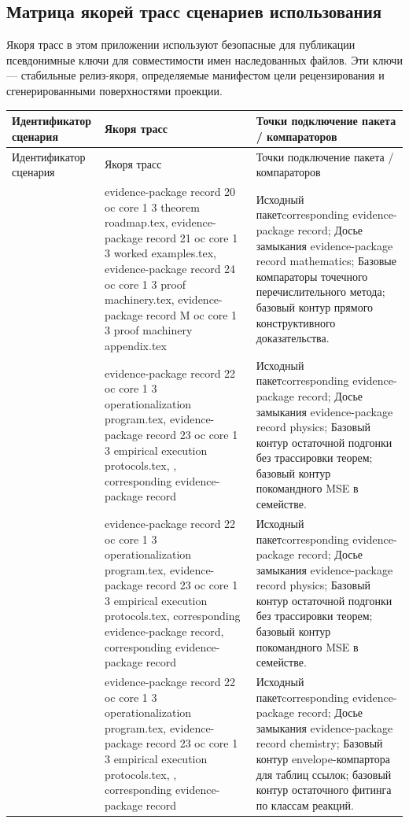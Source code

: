 \subsection{Матрица якорей трасс сценариев использования}
Якоря трасс в этом приложении используют безопасные для публикации псевдонимные ключи для совместимости имен наследованных файлов. Эти ключи — стабильные релиз-якоря, определяемые манифестом цели рецензирования и сгенерированными поверхностями проекции.
\begin{longtable}{@{}L{0.16\textwidth}L{0.38\textwidth}L{0.34\textwidth}@{}}
\toprule
Идентификатор сценария & Якоря трасс & Точки подключение пакета / компараторов \\
\midrule
\endfirsthead
\toprule
Идентификатор сценария & Якоря трасс & Точки подключение пакета / компараторов \\
\midrule
\endhead
{} & evidence-package record 20 oc core 1 3 theorem roadmap.tex, \allowbreak evidence-package record 21 oc core 1 3 worked examples.tex, \allowbreak evidence-package record 24 oc core 1 3 proof machinery.tex, \allowbreak evidence-package record M oc core 1 3 proof machinery appendix.tex & Исходный пакетcorresponding evidence-package record; Досье замыкания evidence-package record mathematics; Базовые компараторы точечного перечислительного метода; базовый контур прямого конструктивного доказательства. \\
 & evidence-package record 22 oc core 1 3 operationalization program.tex, \allowbreak evidence-package record 23 oc core 1 3 empirical execution protocols.tex, \allowbreak {}, corresponding evidence-package record & Исходный пакетcorresponding evidence-package record; Досье замыкания evidence-package record physics; Базовый контур остаточной подгонки без трассировки теорем; базовый контур покомандного MSE в семействе. \\
 & evidence-package record 22 oc core 1 3 operationalization program.tex, \allowbreak evidence-package record 23 oc core 1 3 empirical execution protocols.tex, corresponding evidence-package record, corresponding evidence-package record & Исходный пакетcorresponding evidence-package record; Досье замыкания evidence-package record physics; Базовый контур остаточной подгонки без трассировки теорем; базовый контур покомандного MSE в семействе. \\
 & evidence-package record 22 oc core 1 3 operationalization program.tex, \allowbreak evidence-package record 23 oc core 1 3 empirical execution protocols.tex, \allowbreak {}, corresponding evidence-package record & Исходный пакетcorresponding evidence-package record; Досье замыкания evidence-package record chemistry; Базовый контур envelope-компартора для таблиц ссылок; базовый контур остаточного фитинга по классам реакций. \\

\end{longtable}

